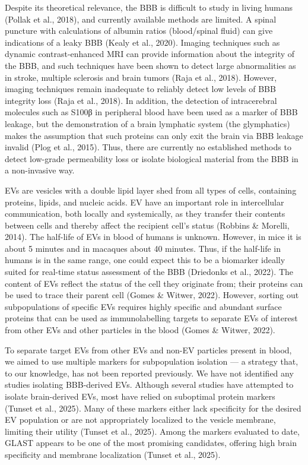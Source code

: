 \documentclass[authordate, empirical, issue]{jote-new-article}
\begin{document}
	Despite its theoretical relevance, the BBB is difficult to study in living humans (Pollak et al., 2018), and currently available methods are limited. A spinal puncture with calculations of albumin ratios (blood/spinal fluid) can give indications of a leaky BBB (Kealy et al., 2020). Imaging techniques such as dynamic contrast-enhanced MRI can provide information about the integrity of the BBB, and such techniques have been shown to detect large abnormalities as in stroke, multiple sclerosis and brain tumors (Raja et al., 2018). However, imaging techniques remain inadequate to reliably detect low levels of BBB integrity loss (Raja et al., 2018). In addition, the detection of intracerebral molecules such as S100β in peripheral blood have been used as a marker of BBB leakage, but the demonstration of a brain lymphatic system (the glymphatics) makes the assumption that such proteins can only exit the brain via BBB leakage invalid (Plog et al., 2015). Thus, there are currently no established methods to detect low-grade permeability loss or isolate biological material from the BBB in a non-invasive way.



	EVs are vesicles with a double lipid layer shed from all types of cells, containing proteins, lipids, and nucleic acids. EV have an important role in intercellular communication, both locally and systemically, as they transfer their contents between cells and thereby affect the recipient cell's status (Robbins \& Morelli, 2014). The half-life of EVs in blood of humans is unknown. However, in mice it is about 5 minutes and in macaques about 40 minutes. Thus, if the half-life in humans is in the same range, one could expect this to be a biomarker ideally suited for real-time status assessment of the BBB (Driedonks et al., 2022). The content of EVs reflect the status of the cell they originate from; their proteins can be used to trace their parent cell (Gomes \& Witwer, 2022). However, sorting out subpopulations of specific EVs requires highly specific and abundant surface proteins that can be used as immunolabelling targets to separate EVs of interest from other EVs and other particles in the blood (Gomes \& Witwer, 2022).



	To separate target EVs from other EVs and non-EV particles present in blood, we aimed to use multiple markers for subpopulation isolation — a strategy that, to our knowledge, has not been reported previously. We have not identified any studies isolating BBB-derived EVs. Although several studies have attempted to isolate brain-derived EVs, most have relied on suboptimal protein markers (Tunset et al., 2025). Many of these markers either lack specificity for the desired EV population or are not appropriately localized to the vesicle membrane, limiting their utility (Tunset et al., 2025). Among the markers evaluated to date, GLAST appears to be one of the most promising candidates, offering high brain specificity and membrane localization (Tunset et al., 2025).
\end{document}
